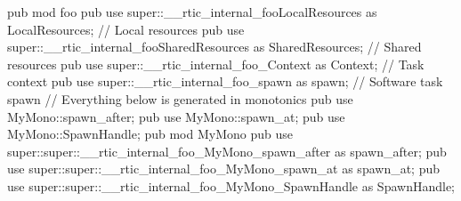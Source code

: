 pub mod foo {
    pub use super::__rtic_internal_fooLocalResources as LocalResources;   // Local resources
    pub use super::__rtic_internal_fooSharedResources as SharedResources; // Shared resources
    pub use super::__rtic_internal_foo_Context as Context;                // Task context
    pub use super::__rtic_internal_foo_spawn as spawn;                    // Software task spawn
    // Everything below is generated in monotonics
    pub use MyMono::spawn_after;
    pub use MyMono::spawn_at;
    pub use MyMono::SpawnHandle;
    pub mod MyMono {
        pub use super::super::__rtic_internal_foo_MyMono_spawn_after as spawn_after;
        pub use super::super::__rtic_internal_foo_MyMono_spawn_at as spawn_at;
        pub use super::super::__rtic_internal_foo_MyMono_SpawnHandle as SpawnHandle;
    }
}